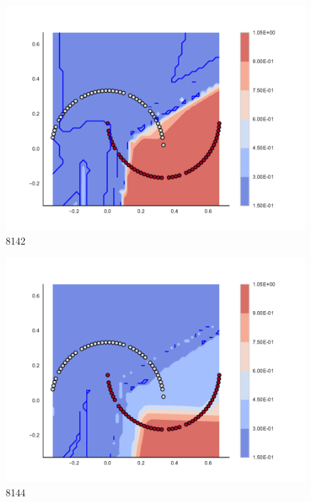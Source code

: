 \begin{subfigure}[b]{0.09\textwidth}
    \includegraphics[clip, trim=2.35cm 1.75cm 4.5cm 0cm,width=\textwidth]{img/convergence/8142.pdf}
    \caption{8142}
    \label{fig:convergence_8142}
\end{subfigure}
%
\begin{subfigure}[b]{0.09\textwidth}
    \includegraphics[clip, trim=2.35cm 1.75cm 4.5cm 0cm,width=\textwidth]{img/convergence/8144.pdf}
    \caption{8144}
    \label{fig:convergence_8144}
\end{subfigure}
%
